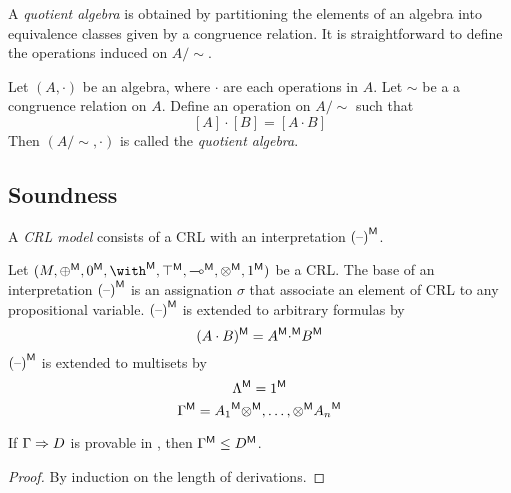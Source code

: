 A {\em quotient algebra} is obtained 
by partitioning the elements of an algebra into equivalence classes 
given by a congruence relation.
It is straightforward to define the operations induced on $A/\sim$.

\begin{definition} 
Let $(A,\cdot)$ be an algebra, where $\cdot$ are each operations in $A$.
Let $\sim$ be a a congruence relation on $A$. 
Define an operation on $A / \sim$ such that
\[ [A] \cdot [B]  = [A \cdot B] \]
Then  $ (A / \sim, \cdot)$ is called the {\em quotient algebra}. 
\end{definition}

\subsection{Soundness}

\begin{definition} 
A {\em CRL model} consists of a CRL 
with an interpretation ${{(\mbox{\textendash})}}^{\sf M}$.
\end{definition}



\begin{definition} [interpretation]
Let $(M,
\interpret{\LLoplus},\interpret{\LLzero},
\interpret{\with},\interpret{\LLtop},
\interpret{\LLimp},\interpret{\LLotimes},\interpret{\LLone})$ be a CRL. 
The base of an interpretation ${{(\mbox{\textendash})}}^{\sf M}$  
is an assignation $\sigma$ 
that associate an element of CRL to any propositional variable.
${{(\mbox{\textendash})}}^{\sf M}$ is extended to arbitrary formulas by
\[ (A \cdot B)^{\sf M}  =  {A}^{\sf M} {\cdot}^{\sf M} {B}^{\sf M} \] 
${{(\mbox{\textendash})}}^{\sf M}$ is extended to multisets by
\[
{\Lambda}^{\sf M} = {\mbox{\boldmath{1}}}^{\sf M}
\]
\[
{\Gamma}^{\sf M} = 
{A_1}^{\sf M} {\otimes}^{\sf M}, \ldots, {\otimes}^{\sf M}
{A_n}^{\sf M} 
\]
\end{definition}


\begin{theorem} [soundness]
If $\Gamma \Rightarrow D$ is provable in {\MALLsystem}, 
then ${\Gamma}^{\sf M} \leq {D}^{\sf M}$. 
\end{theorem}
\begin{proof}
By induction on the length of derivations. 
\end{proof}

